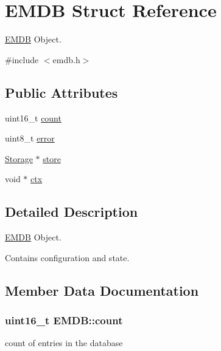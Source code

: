 \hypertarget{struct_e_m_d_b}{}\section{E\+M\+D\+B Struct Reference}
\label{struct_e_m_d_b}


\hyperlink{struct_e_m_d_b}{E\+M\+D\+B} Object.  




{\ttfamily \#include $<$emdb.\+h$>$}

\subsection*{Public Attributes}
\begin{DoxyCompactItemize}
\item 
uint16\+\_\+t \hyperlink{struct_e_m_d_b_af8d58f4313bf60ef13bae9e1aae57c4c}{count}
\item 
uint8\+\_\+t \hyperlink{struct_e_m_d_b_ae32927fa60a17d82bf46e33433054272}{error}
\item 
\hyperlink{struct_storage}{Storage} $\ast$ \hyperlink{struct_e_m_d_b_a872289fb194a97cf2718c680a7cee154}{store}
\item 
void $\ast$ \hyperlink{struct_e_m_d_b_a726fbe533f115c88e1afb228a9a19116}{ctx}
\end{DoxyCompactItemize}


\subsection{Detailed Description}
\hyperlink{struct_e_m_d_b}{E\+M\+D\+B} Object. 

Contains configuration and state. 

\subsection{Member Data Documentation}
\hypertarget{struct_e_m_d_b_af8d58f4313bf60ef13bae9e1aae57c4c}{}
\subsubsection[{count}]{\setlength{\rightskip}{0pt plus 5cm}uint16\+\_\+t E\+M\+D\+B\+::count}\label{struct_e_m_d_b_af8d58f4313bf60ef13bae9e1aae57c4c}
count of entries in the database \hypertarget{struct_e_m_d_b_a726fbe533f115c88e1afb228a9a19116}{}
